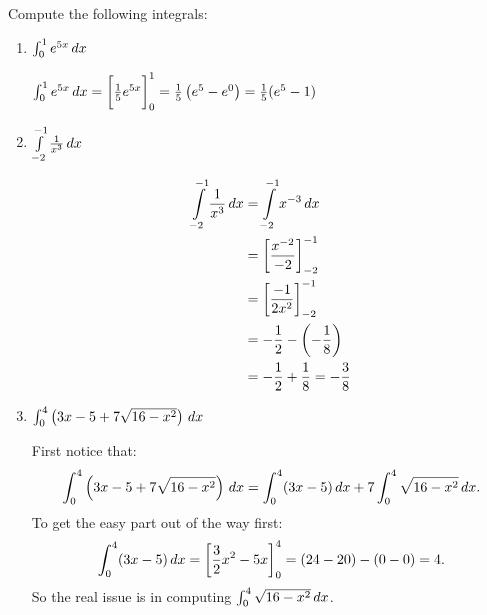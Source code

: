 \documentclass[nooutcomes,handout]{ximera}
\begin{document}
\begin{problem}
  Compute the following integrals:
  \begin{enumerate}
    

  \item  $\int_0^1 e^{5x} \,d x$
    \begin{freeResponse}
      $\int_0^1 e^{5x} \,d x  = \bigg[ \frac{1}{5} e^{5x} \bigg]_0^1= \frac{1}{5} \left( e^5 - e^0 \right) = \frac{1}{5} (e^5 - 1)$
    \end{freeResponse}
    

  \item  $\int\limits_{-2}^{-1} \frac{1}{x^3} \,d x$
    \begin{freeResponse}
      \begin{align*}
        \int\limits_{-2}^{-1} \frac{1}{x^3} \,d x &= \int\limits_{-2}^{-1} x^{-3} \,d x  \\
                                                 &= \bigg[ \frac{x^{-2}}{-2} \bigg]_{-2}^{-1}  \\
                                                 &= \bigg[ \frac{-1}{2x^2} \bigg]_{-2}^{-1}  \\
                                                 &= - \frac{1}{2} - \left( - \frac{1}{8} \right)  \\
                                                 &= - \frac{1}{2} + \frac{1}{8} = - \frac{3}{8}
      \end{align*}
    \end{freeResponse}

  \item  $\int _0^4 \left( 3x - 5 + 7 \sqrt{16-x^2} \right) \,d x$
    \begin{freeResponse}
      First notice that:
      \begin{equation}\label{eq1}
        \int _0^4 \left( 3x - 5 + 7 \sqrt{16-x^2} \right) \,d x = \int_0^4 ( 3x - 5) \,d x + 7 \int_0^4 \sqrt{16-x^2} \,d x.
      \end{equation}
      To get the easy part out of the way first:
      \begin{equation}\label{eq2}
        \int_0^4 (3x-5) \,d x = \bigg[ \frac{3}{2} x^2 - 5x \bigg]_0^4 = (24 - 20) - (0-0) = 4. 
      \end{equation}
      So the real issue is in computing $\int_0^4 \sqrt{16-x^2} \,d x$.  
      

\end{freeResponse}
\end{enumerate}
\end{problem}
\end{document}
